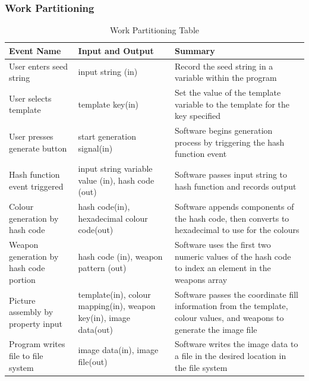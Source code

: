 \documentclass[12pt, titlepage]{article}
\begin{document}
\subsubsection{Work Partitioning}
\begin{table}[h!]
\caption{Work Partitioning Table}
\label{wpt}
\begin{tabular}{|p{4cm}|p{4cm}|p{8cm}|}
\hline
Event Name & Input and Output & Summary \\ \hline
      User enters seed string   &     input string (in)           &    Record the seed string in a variable within the program  \\ \hline
	User selects template & template key(in) & Set the value of the template variable to the template for the key specified \\ \hline
	User presses generate button & start generation signal(in) & Software begins generation process by triggering the hash function event \\ \hline
	Hash function event triggered & input string variable value (in), hash code (out) & Software passes input string to hash function and records output \\ \hline
       Colour generation by hash code & hash code(in), hexadecimal colour code(out) & Software appends components of the hash code, then converts to hexadecimal to use for the colours \\ \hline
	Weapon generation by hash code portion & hash code (in), weapon pattern (out) & Software uses the first two numeric values of the hash code to index an element in the weapons array \\ \hline
	Picture assembly by property input & template(in), colour mapping(in), weapon key(in), image data(out) & Software passes the coordinate fill information from the template, colour values, and weapons to generate the image file\\ \hline
	Program writes file to file system & image data(in), image file(out) & Software writes the image data to a file in the desired location in the file system \\ \hline
\end{tabular}
\end{table}
\newpage
\end{document}
